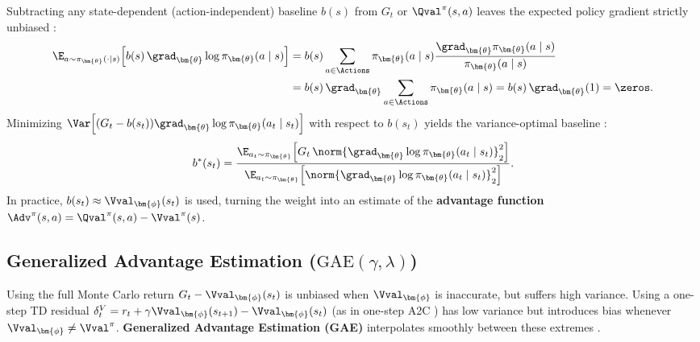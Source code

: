 \documentclass[../../../../master.tex]{subfiles}
\begin{document}
\begin{coremath}
Subtracting any state-dependent (action-independent) baseline $b(s)$ from $G_t$ or $\Qval^\pi(s, a)$ leaves the expected policy gradient strictly unbiased  :
\begin{align}
  \E_{a \sim \pi_{\bm{\theta}}(\cdot \mid s)}\!\left[ b(s)\, \grad_{\bm{\theta}} \log \pi_{\bm{\theta}}(a \mid s) \right]
  &= b(s) \sum_{a \in \Actions} \pi_{\bm{\theta}}(a \mid s) \frac{\grad_{\bm{\theta}} \pi_{\bm{\theta}}(a \mid s)}{\pi_{\bm{\theta}}(a \mid s)} \nonumber \\
  &= b(s)\, \grad_{\bm{\theta}} \sum_{a \in \Actions} \pi_{\bm{\theta}}(a \mid s) = b(s)\, \grad_{\bm{\theta}}(1) = \zeros. \label{eq:pg:baseline_zero}
\end{align}
Minimizing $\Var\!\left[(G_t - b(s_t))\grad_{\bm{\theta}}\log \pi_{\bm{\theta}}(a_t \mid s_t)\right]$ with respect to $b(s_t)$ yields the variance-optimal baseline :
\begin{equation}\label{eq:pg:opt_baseline}
  b^*(s_t) = \frac{\E_{a_t \sim \pi_{\bm{\theta}}}\!\left[ G_t\, \norm{\grad_{\bm{\theta}} \log \pi_{\bm{\theta}}(a_t \mid s_t)}_2^2 \right]}{\E_{a_t \sim \pi_{\bm{\theta}}}\!\left[ \norm{\grad_{\bm{\theta}} \log \pi_{\bm{\theta}}(a_t \mid s_t)}_2^2 \right]}.
\end{equation}
In practice, $b(s_t) \approx \Vval_{\bm{\phi}}(s_t)$ is used, turning the weight into an estimate of the \textbf{advantage function} $\Adv^\pi(s, a) = \Qval^\pi(s, a) - \Vval^\pi(s)$.
\end{coremath}

\subsection{Generalized Advantage Estimation ($\mathrm{GAE}(\gamma, \lambda)$)}

Using the full Monte Carlo return $G_t - \Vval_{\bm{\phi}}(s_t)$ is unbiased when $\Vval_{\bm{\phi}}$ is inaccurate, but suffers high variance. Using a one-step TD residual $\delta_t^V = r_t + \gamma \Vval_{\bm{\phi}}(s_{t+1}) - \Vval_{\bm{\phi}}(s_t)$ (as in one-step A2C ) has low variance but introduces bias whenever $\Vval_{\bm{\phi}} \ne \Vval^\pi$. \textbf{Generalized Advantage Estimation (GAE)} interpolates smoothly between these extremes .
\end{document}
